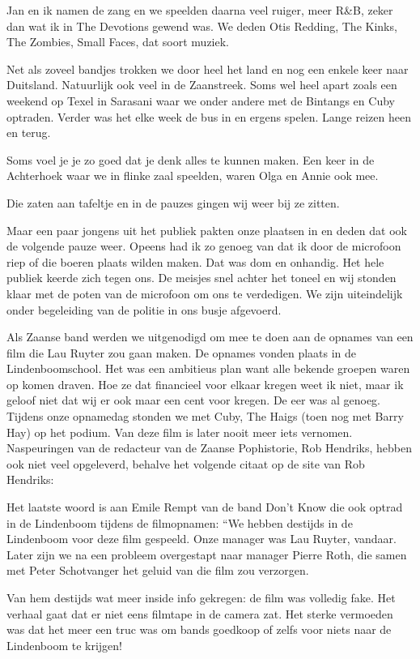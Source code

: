 \documentclass[10pt,twoside,openright]{memoir}
\begin{document}
Jan en ik namen de zang en we speelden daarna veel ruiger, meer R&B, zeker dan wat ik in The Devotions gewend was. We deden Otis Redding, The Kinks, The Zombies, Small Faces, dat soort muziek.

Net als zoveel bandjes trokken we door heel het land en nog een enkele keer naar Duitsland. Natuurlijk ook veel in de Zaanstreek. Soms wel heel apart zoals een weekend op Texel in Sarasani waar we onder andere met de Bintangs en Cuby optraden. Verder was het elke week de bus in en ergens spelen. Lange reizen heen en terug.

Soms voel je je zo goed dat je denk alles te kunnen maken. 
Een keer in de Achterhoek waar we in flinke zaal speelden, waren Olga en Annie ook mee. 

Die zaten aan tafeltje en in de pauzes gingen wij weer bij ze zitten. 

Maar een paar jongens uit het publiek pakten onze plaatsen in en deden dat ook de volgende pauze weer. Opeens had ik zo genoeg van dat ik door de microfoon riep of die boeren plaats wilden maken. Dat was dom en onhandig. Het hele publiek keerde zich tegen ons. De meisjes snel achter het toneel en wij stonden klaar met de poten van de microfoon om ons te verdedigen. We zijn uiteindelijk onder begeleiding van de politie in ons busje afgevoerd.

Als Zaanse band werden we uitgenodigd om mee te doen aan de opnames van een film die Lau Ruyter zou gaan maken. De opnames vonden plaats in de Lindenboomschool. Het was een ambitieus plan want alle bekende groepen waren op komen draven. Hoe ze dat financieel voor elkaar kregen weet ik niet, maar ik geloof niet dat wij er ook maar een cent voor kregen. De eer was al genoeg. Tijdens onze opnamedag stonden we met Cuby, The Haigs (toen nog met Barry Hay) op het podium. Van deze film is later nooit meer iets vernomen. Naspeuringen van de redacteur van de Zaanse Pophistorie, Rob Hendriks, hebben ook niet veel opgeleverd, behalve het volgende citaat op de site van Rob Hendriks: 

Het laatste woord is aan Emile Rempt van de band Don’t Know die ook optrad in de Lindenboom tijdens de filmopnamen: “We hebben destijds in de Lindenboom voor deze film gespeeld. Onze manager was Lau Ruyter, vandaar. Later zijn we na een probleem overgestapt naar manager Pierre Roth, die samen met Peter Schotvanger het geluid van die film zou verzorgen.

Van hem destijds wat meer inside info gekregen: de film was volledig fake. Het verhaal gaat dat er niet eens filmtape in de camera zat. Het sterke vermoeden was dat het meer een truc was om bands goedkoop of zelfs voor niets naar de Lindenboom te krijgen!
\end{document}
